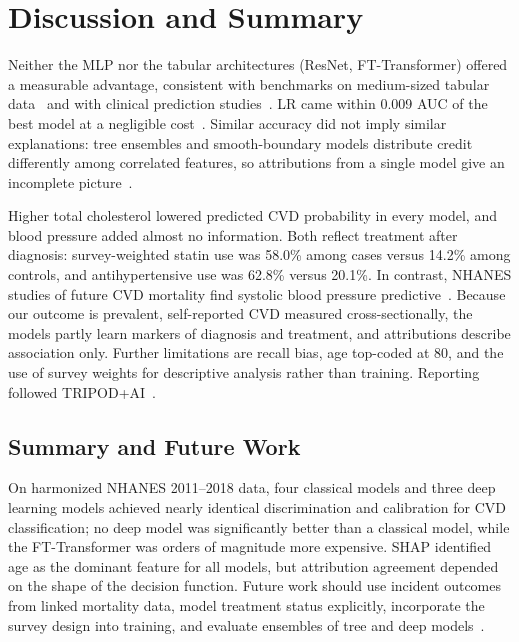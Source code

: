 \documentclass[journal]{IEEEtran}
\begin{document}
\section{Discussion and Summary}
Neither the MLP nor the tabular architectures (ResNet, FT-Transformer) offered a measurable advantage, consistent with benchmarks on medium-sized tabular data~\cite{grinsztajn2022,shwartzziv2022} and with clinical prediction studies~\cite{christodoulou2019,weng2017}. LR came within 0.009 AUC of the best model at a negligible cost~\cite{rudin2019}. Similar accuracy did not imply similar explanations: tree ensembles and smooth-boundary models distribute credit differently among correlated features, so attributions from a single model give an incomplete picture~\cite{krishna2024,hooker2021}.

Higher total cholesterol lowered predicted CVD probability in every model, and blood pressure added almost no information. Both reflect treatment after diagnosis: survey-weighted statin use was 58.0\% among cases versus 14.2\% among controls, and antihypertensive use was 62.8\% versus 20.1\%. In contrast, NHANES studies of future CVD mortality find systolic blood pressure predictive~\cite{martinmorales2023}. Because our outcome is prevalent, self-reported CVD measured cross-sectionally, the models partly learn markers of diagnosis and treatment, and attributions describe association only. Further limitations are recall bias, age top-coded at 80, and the use of survey weights for descriptive analysis rather than training. Reporting followed TRIPOD+AI~\cite{collins2024}.

\subsection{Summary and Future Work}
On harmonized NHANES 2011--2018 data, four classical models and three deep learning models achieved nearly identical discrimination and calibration for CVD classification; no deep model was significantly better than a classical model, while the FT-Transformer was orders of magnitude more expensive. SHAP identified age as the dominant feature for all models, but attribution agreement depended on the shape of the decision function. Future work should use incident outcomes from linked mortality data, model treatment status explicitly, incorporate the survey design into training, and evaluate ensembles of tree and deep models~\cite{shwartzziv2022}.
\end{document}
